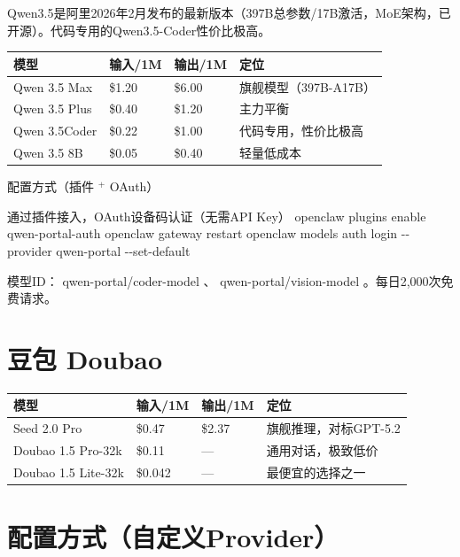 \documentclass[
  10
]{article}
\newenvironment{Shaded}{}{}
\newcommand{\NormalTok}[1]{#1}
\newcounter{none} %
\begin{document}
Qwen3.5是阿里2026年2月发布的最新版本（397B总参数/17B激活，MoE架构，已开源）。代码专用的Qwen3.5-Coder性价比极高。

{\def\LTcaptype{none} %
\begin{longtable}[]{@{}|l|l|l|l|@{}}
\toprule\noalign{}
\endhead
\bottomrule\noalign{}
\endlastfoot
\hline
模型 & 输入/1M & 输出/1M & 定位 \\
\hline
Qwen 3.5 Max & \$1.20 & \$6.00 & 旗舰模型（397B-A17B） \\
\hline
Qwen 3.5 Plus & \$0.40 & \$1.20 & 主力平衡 \\
\hline
Qwen 3.5Coder & \$0.22 & \$1.00 & 代码专用，性价比极高 \\
\hline
Qwen 3.5 8B & \$0.05 & \$0.40 & 轻量低成本 \\
\hline
\end{longtable}
}

配置方式（插件 \(^ +\) OAuth）

\begin{Shaded}
\begin{Highlighting}[]
\NormalTok{通过插件接入，OAuth设备码认证（无需API Key）  }
\NormalTok{openclaw plugins enable qwen{-}portal{-}auth  }
\NormalTok{openclaw gateway restart  }
\NormalTok{openclaw models auth login {-}{-}provider qwen{-}portal {-}{-}set{-}default}
\end{Highlighting}
\end{Shaded}

模型ID： qwen-portal/coder-model 、 qwen-portal/vision-model
。每日2,000次免费请求。

\section{豆包 Doubao}\label{ux8c46ux5305-doubao}

{\def\LTcaptype{none} %
\begin{longtable}[]{@{}|l|l|l|l|@{}}
\toprule\noalign{}
\endhead
\bottomrule\noalign{}
\endlastfoot
\hline
模型 & 输入/1M & 输出/1M & 定位 \\
\hline
Seed 2.0 Pro & \$0.47 & \$2.37 & 旗舰推理，对标GPT-5.2 \\
\hline
Doubao 1.5 Pro-32k & \$0.11 & --- & 通用对话，极致低价 \\
\hline
Doubao 1.5 Lite-32k & \$0.042 & --- & 最便宜的选择之一 \\
\hline
\end{longtable}
}

\section{配置方式（自定义Provider）}\label{ux914dux7f6eux65b9ux5f0fux81eaux5b9aux4e49provider-1}
\end{document}
